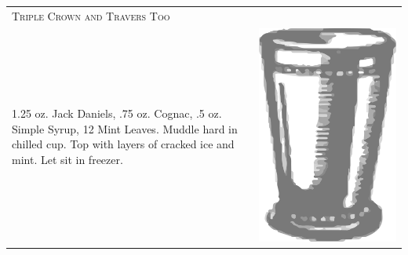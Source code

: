 \documentclass{article}
\begin{document}
\begin{tabular}{p{2in} p{0.5in}}
  \multicolumn{2}{p{3in}}{\centering\Huge\textsc{Triple Crown and Travers Too}} \\ 
  
   \vspace{-0.1in}1.25 oz. Jack Daniels, .75 oz. Cognac, .5 oz. Simple Syrup,
    12 Mint Leaves. Muddle hard in chilled cup. Top with layers of
    cracked ice and mint. Let sit in freezer. &
   \vspace{-0.1in} \includegraphics{julep.png}
\end{tabular}
\end{document}
